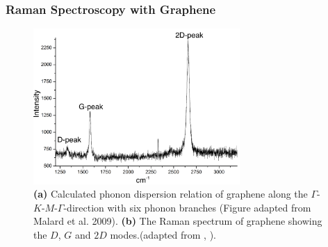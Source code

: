 \subsubsection{Raman Spectroscopy with Graphene}

\begin{figure}[!h]
  \centering
  \includegraphics[width=0.7\textwidth]{./images/graphene-raman.png}
  \caption{\textbf{(a)} Calculated phonon dispersion relation of graphene along the $\Gamma$-$K$-$M$-$\Gamma$-direction with six phonon branches (Figure adapted from Malard et al. 2009\mcite). \textbf{(b)} The Raman spectrum of graphene showing the $D$, $G$ and $2D$ modes.(adapted from \mcite, ).}
  \label{fig:dispersion}
\end{figure}


